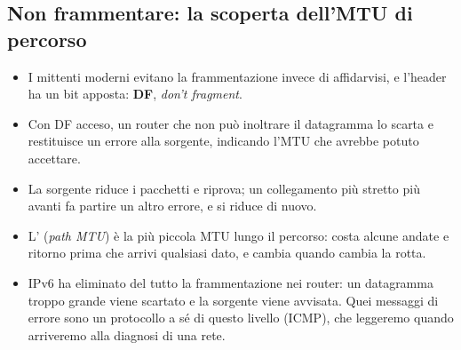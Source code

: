 
\subsection{Non frammentare: la scoperta dell'MTU di percorso}

\begin{itemize}
    \item I mittenti moderni evitano la frammentazione invece di affidarvisi, e l'header ha un bit apposta: \textbf{DF},
          \emph{don't fragment}.
    \item Con DF acceso, un router che non può inoltrare il datagramma lo scarta e restituisce un errore alla sorgente,
          indicando l'MTU che avrebbe potuto accettare.
    \item La sorgente riduce i pacchetti e riprova; un collegamento più stretto più avanti fa partire un altro errore, e si
          riduce di nuovo.
    \item L' (\emph{path MTU}) è la più piccola MTU lungo il percorso: costa alcune andate e ritorno
          prima che arrivi qualsiasi dato, e cambia quando cambia la rotta.
    \item IPv6 ha eliminato del tutto la frammentazione nei router: un datagramma troppo grande viene scartato e la sorgente
          viene avvisata. Quei messaggi di errore sono un protocollo a sé di questo livello (ICMP), che leggeremo quando
          arriveremo alla diagnosi di una rete.
\end{itemize}

